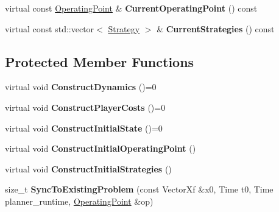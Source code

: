 \begin{DoxyCompactItemize}
\item 
virtual const \hyperlink{structilqgames_1_1_operating_point}{Operating\+Point} \& {\bfseries Current\+Operating\+Point} () const \hypertarget{classilqgames_1_1_problem_a1ed42bdf388f171c0512ccb9c2beefd5}{}\label{classilqgames_1_1_problem_a1ed42bdf388f171c0512ccb9c2beefd5}

\item 
virtual const std\+::vector$<$ \hyperlink{structilqgames_1_1_strategy}{Strategy} $>$ \& {\bfseries Current\+Strategies} () const \hypertarget{classilqgames_1_1_problem_aa0fdfa634828e45493c41d9961879ee2}{}\label{classilqgames_1_1_problem_aa0fdfa634828e45493c41d9961879ee2}

\end{DoxyCompactItemize}
\subsection*{Protected Member Functions}
\begin{DoxyCompactItemize}
\item 
virtual void {\bfseries Construct\+Dynamics} ()=0\hypertarget{classilqgames_1_1_problem_ab0ca7613920421b268d9ffed3b3d3ab5}{}\label{classilqgames_1_1_problem_ab0ca7613920421b268d9ffed3b3d3ab5}

\item 
virtual void {\bfseries Construct\+Player\+Costs} ()=0\hypertarget{classilqgames_1_1_problem_a99928ca641fc5da4ec8da3c97e2566b3}{}\label{classilqgames_1_1_problem_a99928ca641fc5da4ec8da3c97e2566b3}

\item 
virtual void {\bfseries Construct\+Initial\+State} ()=0\hypertarget{classilqgames_1_1_problem_a7033af07315f39ee66ad71a611623b2a}{}\label{classilqgames_1_1_problem_a7033af07315f39ee66ad71a611623b2a}

\item 
virtual void {\bfseries Construct\+Initial\+Operating\+Point} ()\hypertarget{classilqgames_1_1_problem_aa2a59f31887f04eaa0afa7c0d18d44ef}{}\label{classilqgames_1_1_problem_aa2a59f31887f04eaa0afa7c0d18d44ef}

\item 
virtual void {\bfseries Construct\+Initial\+Strategies} ()\hypertarget{classilqgames_1_1_problem_a0d78249b23daf89821cf02b18263ff38}{}\label{classilqgames_1_1_problem_a0d78249b23daf89821cf02b18263ff38}

\item 
size\+\_\+t {\bfseries Sync\+To\+Existing\+Problem} (const Vector\+Xf \&x0, Time t0, Time planner\+\_\+runtime, \hyperlink{structilqgames_1_1_operating_point}{Operating\+Point} \&op)\hypertarget{classilqgames_1_1_problem_ae7f62429b51816a8221603f314ce46c8}{}\label{classilqgames_1_1_problem_ae7f62429b51816a8221603f314ce46c8}

\end{DoxyCompactItemize}
